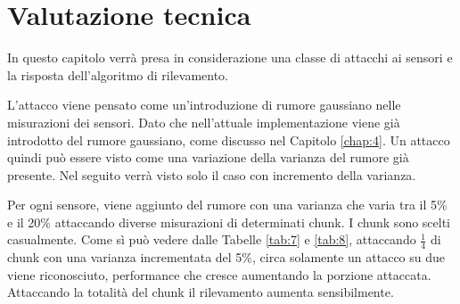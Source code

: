 \documentclass[Lau,binding=0.6cm]{sapthesis}
\begin{document}

\section{Valutazione tecnica}

In questo capitolo verr\`a presa in considerazione una classe di attacchi ai sensori e la risposta dell'algoritmo di rilevamento.

L'attacco viene pensato come un'introduzione di rumore gaussiano nelle misurazioni dei sensori. Dato che nell'attuale implementazione viene gi\`a introdotto del rumore gaussiano, come discusso nel Capitolo \ref{chap:4}. Un attacco quindi pu\`o essere visto come una variazione della varianza del rumore gi\`a presente. 
Nel seguito verr\`a visto solo il caso con incremento della varianza.

Per ogni sensore, viene aggiunto del rumore con una varianza che varia tra il 5\% e il 20\% attaccando diverse misurazioni di determinati chunk. I chunk sono scelti casualmente.
Come sì pu\`o vedere dalle Tabelle \ref{tab:7} e \ref{tab:8}, attaccando $\frac{1}{4}$ di chunk con una varianza incrementata del 5\%, circa solamente un attacco su due viene riconosciuto, performance che cresce aumentando la porzione attaccata.
Attaccando la totalit\`a del chunk il rilevamento aumenta sensibilmente.
\end{document}
